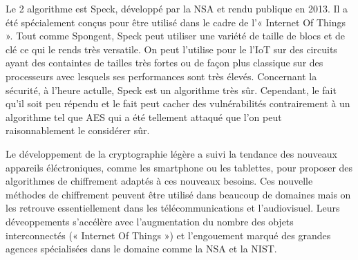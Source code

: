 Le 2 algorithme est Speck, développé par la NSA et rendu publique en
2013. Il a été spécialement conçus pour être utilisé dans le cadre de l'«
Internet Of Things ». Tout comme Spongent, Speck peut utiliser une variété de
taille de blocs et de clé ce qui le rends très versatile. On peut l'utilise pour
le l'IoT sur des circuits ayant des containtes de tailles très fortes ou de
façon plus classique sur des processeurs avec lesquels ses performances sont
très élevés. Concernant la sécurité, à l'heure actulle, Speck est un algorithme
très sûr. Cependant, le fait qu'il soit peu répendu et le fait peut cacher des
vulnérabilités contrairement à un algorithme tel que AES qui a été tellement
attaqué que l'on peut raisonnablement le considérer sûr. 


 Le développement de la cryptographie légère a suivi la tendance des nouveaux
appareils éléctroniques, comme les smartphone ou les tablettes, pour proposer
des algorithmes de chiffrement adaptés à ces nouveaux besoins. Ces nouvelle
méthodes de chiffrement peuvent être utilisé dans beaucoup de domaines mais on
les retrouve essentiellement dans les télécommunications et l'audiovisuel.
Leurs déveoppements s'accélère avec l'augmentation du nombre des objets
interconnectés (« Internet Of Things ») et l'engouement marqué des grandes
agences spécialisées dans le domaine comme la NSA et la NIST.
